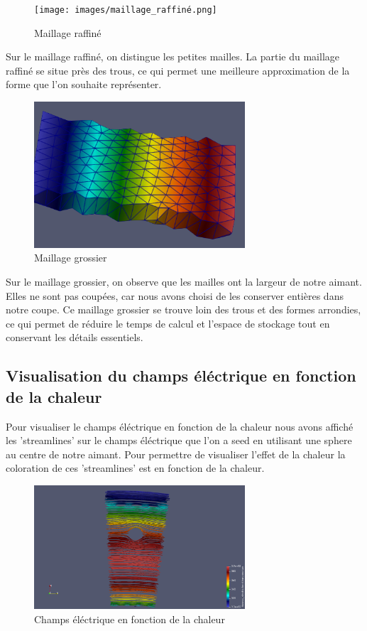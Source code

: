 \documentclass{article}
\begin{document}
\begin{figure}[H]
    \centering
    \texttt{[image: images/maillage\_raffiné.png]}
    \caption{Maillage raffiné}
\end{figure}

Sur le maillage raffiné, on distingue les petites mailles. 
La partie du maillage raffiné se situe près des trous, 
ce qui permet une meilleure approximation de la forme que l'on souhaite représenter.

\begin{figure}[H]
    \centering
    \includegraphics[width=0.7\textwidth]{images/maillage_grossier.png}
    \caption{Maillage grossier}
\end{figure}

Sur le maillage grossier, on observe que les mailles ont la largeur de notre aimant. 
Elles ne sont pas coupées, car nous avons choisi de les conserver entières dans notre coupe. 
Ce maillage grossier se trouve loin des trous et des formes arrondies, 
ce qui permet de réduire le temps de calcul et l’espace de stockage tout en conservant les détails essentiels.

\subsection{Visualisation du champs éléctrique en fonction de la chaleur}
Pour visualiser le champs éléctrique en fonction de la chaleur 
nous avons affiché les 'streamlines' sur le champs éléctrique que l'on a seed en utilisant une sphere au centre de notre aimant. 
Pour permettre de visualiser l'effet de la chaleur la coloration de ces 'streamlines' est en fonction de la chaleur.
\begin{figure}[h]
    \centering
    \includegraphics[width=0.7\textwidth]{images/champ_electrique.png}
    \caption{Champs éléctrique en fonction de la chaleur}
\end{figure}
\end{document}
